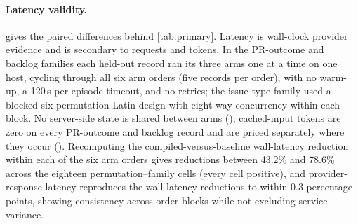 \paragraph{Latency validity.}  gives the paired
differences behind \cref{tab:primary}. Latency is wall-clock provider evidence
and is secondary to requests and tokens. In the PR-outcome and backlog families each
held-out record ran its three arms one at a time on one host, cycling through
all six arm orders (five records per order), with no warm-up, a 120\,s
per-episode timeout, and no retries; the issue-type family used a blocked
six-permutation Latin design with eight-way concurrency within each block. No
server-side state is shared between arms (); cached-input
tokens are zero on every PR-outcome and backlog record and are priced
separately where they occur ().
Recomputing the compiled-versus-baseline wall-latency reduction within each of
the six arm orders gives reductions between 43.2\% and 78.6\% across the eighteen permutation--family cells (every cell positive), and
provider-response latency reproduces the wall-latency reductions to within
0.3 percentage points, showing consistency across order blocks while not excluding service variance.

\begin{table}[ht]
  \centering
  \caption{The hand-written comparator priced on the same resource axes as
  \cref{tab:primary}, as percentage reduction against the same baseline and the
  same held-out records. \emph{Manual} is written with full knowledge of the
  workflow. Pooled over the three families, it ties on provider requests,
  uses fewer interfaces and tokens, and costs slightly less; compilation has
  lower pooled wall latency (bold). Per-family token and cost comparisons vary. The
  interface gap is concentrated in issue-type routing, where the compiled prefix
  covers two reads but the agent still issues the third. We therefore claim
  automated discovery and guarded admission, not runtime dominance over code
  written by someone who already knows the workflow.}
  \label{tab:manual-resources}
  \footnotesize
  
\end{table}

